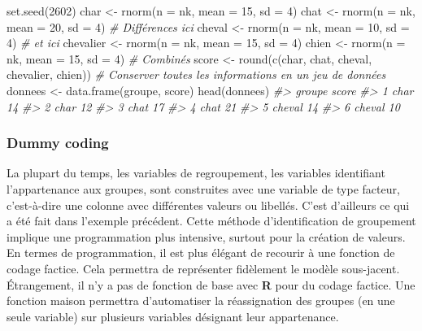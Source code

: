 \documentclass[
]{book}
\newenvironment{Shaded}{}{}
\newcommand{\AttributeTok}[1]{#1}
\newcommand{\CommentTok}[1]{\textit{#1}}
\newcommand{\DecValTok}[1]{#1}
\newcommand{\FunctionTok}[1]{#1}
\newcommand{\NormalTok}[1]{#1}
\newcommand{\OtherTok}[1]{#1}
\begin{document}
\begin{Shaded}
\begin{Highlighting}[]
\FunctionTok{set.seed}\NormalTok{(}\DecValTok{2602}\NormalTok{)}
\NormalTok{char      }\OtherTok{\textless{}{-}} \FunctionTok{rnorm}\NormalTok{(}\AttributeTok{n =}\NormalTok{ nk, }\AttributeTok{mean =} \DecValTok{15}\NormalTok{, }\AttributeTok{sd =} \DecValTok{4}\NormalTok{) }
\NormalTok{chat      }\OtherTok{\textless{}{-}} \FunctionTok{rnorm}\NormalTok{(}\AttributeTok{n =}\NormalTok{ nk, }\AttributeTok{mean =} \DecValTok{20}\NormalTok{, }\AttributeTok{sd =} \DecValTok{4}\NormalTok{) }\CommentTok{\# Différences ici}
\NormalTok{cheval    }\OtherTok{\textless{}{-}} \FunctionTok{rnorm}\NormalTok{(}\AttributeTok{n =}\NormalTok{ nk, }\AttributeTok{mean =} \DecValTok{10}\NormalTok{, }\AttributeTok{sd =} \DecValTok{4}\NormalTok{) }\CommentTok{\# et ici}
\NormalTok{chevalier }\OtherTok{\textless{}{-}} \FunctionTok{rnorm}\NormalTok{(}\AttributeTok{n =}\NormalTok{ nk, }\AttributeTok{mean =} \DecValTok{15}\NormalTok{, }\AttributeTok{sd =} \DecValTok{4}\NormalTok{)}
\NormalTok{chien     }\OtherTok{\textless{}{-}} \FunctionTok{rnorm}\NormalTok{(}\AttributeTok{n =}\NormalTok{ nk, }\AttributeTok{mean =} \DecValTok{15}\NormalTok{, }\AttributeTok{sd =} \DecValTok{4}\NormalTok{) }
\CommentTok{\# Combinés}
\NormalTok{score }\OtherTok{\textless{}{-}} \FunctionTok{round}\NormalTok{(}\FunctionTok{c}\NormalTok{(char, chat, cheval, chevalier, chien))}
\CommentTok{\# Conserver toutes les informations en un jeu de données}
\NormalTok{donnees }\OtherTok{\textless{}{-}} \FunctionTok{data.frame}\NormalTok{(groupe, score)}
\FunctionTok{head}\NormalTok{(donnees)}
\CommentTok{\#\textgreater{}   groupe score}
\CommentTok{\#\textgreater{} 1   char    14}
\CommentTok{\#\textgreater{} 2   char    12}
\CommentTok{\#\textgreater{} 3   chat    17}
\CommentTok{\#\textgreater{} 4   chat    21}
\CommentTok{\#\textgreater{} 5 cheval    14}
\CommentTok{\#\textgreater{} 6 cheval    10}
\end{Highlighting}
\end{Shaded}

\hypertarget{dummy-coding}{%
\subsubsection{Dummy coding}\label{dummy-coding}}

La plupart du temps, les variables de regroupement, les variables identifiant l'appartenance aux groupes, sont construites avec une variable de type facteur, c'est-à-dire une colonne avec différentes valeurs ou libellés. C'est d'ailleurs ce qui a été fait dans l'exemple précédent. Cette méthode d'identification de groupement implique une programmation plus intensive, surtout pour la création de valeurs. En termes de programmation, il est plus élégant de recourir à une fonction de codage factice. Cela permettra de représenter fidèlement le modèle sous-jacent. Étrangement, il n'y a pas de fonction de base avec \textbf{R} pour du codage factice. Une fonction maison permettra d'automatiser la réassignation des groupes (en une seule variable) sur plusieurs variables désignant leur appartenance.
\end{document}
